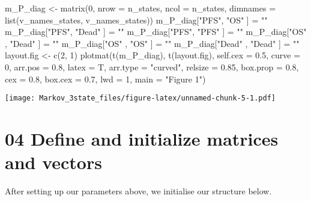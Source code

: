 \documentclass[
]{article}
\newenvironment{Shaded}{\begin{snugshade}}{\end{snugshade}}
\newcommand{\AttributeTok}[1]{\textcolor[rgb]{0.77,0.63,0.00}{#1}}
\newcommand{\DecValTok}[1]{\textcolor[rgb]{0.00,0.00,0.81}{#1}}
\newcommand{\FloatTok}[1]{\textcolor[rgb]{0.00,0.00,0.81}{#1}}
\newcommand{\FunctionTok}[1]{\textcolor[rgb]{0.00,0.00,0.00}{#1}}
\newcommand{\NormalTok}[1]{#1}
\newcommand{\OtherTok}[1]{\textcolor[rgb]{0.56,0.35,0.01}{#1}}
\newcommand{\StringTok}[1]{\textcolor[rgb]{0.31,0.60,0.02}{#1}}
\begin{document}
\begin{Shaded}
\begin{Highlighting}[]
\NormalTok{m\_P\_diag }\OtherTok{\textless{}{-}} \FunctionTok{matrix}\NormalTok{(}\DecValTok{0}\NormalTok{, }\AttributeTok{nrow =}\NormalTok{ n\_states, }\AttributeTok{ncol =}\NormalTok{ n\_states, }\AttributeTok{dimnames =} \FunctionTok{list}\NormalTok{(v\_names\_states, v\_names\_states))}
\NormalTok{m\_P\_diag[}\StringTok{"PFS"}\NormalTok{, }\StringTok{"OS"}\NormalTok{ ]     }\OtherTok{=} \StringTok{""} 
\NormalTok{m\_P\_diag[}\StringTok{"PFS"}\NormalTok{, }\StringTok{"Dead"}\NormalTok{ ]     }\OtherTok{=} \StringTok{""}
\NormalTok{m\_P\_diag[}\StringTok{"PFS"}\NormalTok{, }\StringTok{"PFS"}\NormalTok{ ]  }\OtherTok{=} \StringTok{""}
\NormalTok{m\_P\_diag[}\StringTok{"OS"}\NormalTok{   , }\StringTok{"Dead"}\NormalTok{ ]     }\OtherTok{=} \StringTok{""}
\NormalTok{m\_P\_diag[}\StringTok{"OS"}\NormalTok{   , }\StringTok{"OS"}\NormalTok{ ]     }\OtherTok{=} \StringTok{""}
\NormalTok{m\_P\_diag[}\StringTok{"Dead"}\NormalTok{   , }\StringTok{"Dead"}\NormalTok{ ]     }\OtherTok{=} \StringTok{""}
\NormalTok{layout.fig }\OtherTok{\textless{}{-}} \FunctionTok{c}\NormalTok{(}\DecValTok{2}\NormalTok{, }\DecValTok{1}\NormalTok{)}
\FunctionTok{plotmat}\NormalTok{(}\FunctionTok{t}\NormalTok{(m\_P\_diag), }\FunctionTok{t}\NormalTok{(layout.fig), }\AttributeTok{self.cex =} \FloatTok{0.5}\NormalTok{, }\AttributeTok{curve =} \DecValTok{0}\NormalTok{, }\AttributeTok{arr.pos =} \FloatTok{0.8}\NormalTok{,  }
        \AttributeTok{latex =}\NormalTok{ T, }\AttributeTok{arr.type =} \StringTok{"curved"}\NormalTok{, }\AttributeTok{relsize =} \FloatTok{0.85}\NormalTok{, }\AttributeTok{box.prop =} \FloatTok{0.8}\NormalTok{, }
        \AttributeTok{cex =} \FloatTok{0.8}\NormalTok{, }\AttributeTok{box.cex =} \FloatTok{0.7}\NormalTok{, }\AttributeTok{lwd =} \DecValTok{1}\NormalTok{, }\AttributeTok{main =} \StringTok{"Figure 1"}\NormalTok{)}
\end{Highlighting}
\end{Shaded}

\texttt{[image: Markov\_3state\_files/figure-latex/unnamed-chunk-5-1.pdf]}

\hypertarget{define-and-initialize-matrices-and-vectors}{%
\section{04 Define and initialize matrices and
vectors}\label{define-and-initialize-matrices-and-vectors}}

After setting up our parameters above, we initialise our structure
below.
\end{document}

